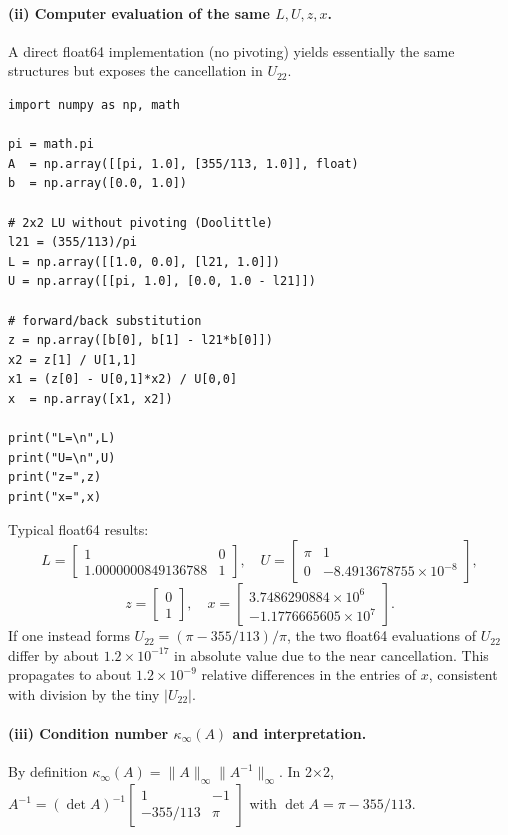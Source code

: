 \documentclass[11pt]{article}
\begin{document}
\paragraph{(ii) Computer evaluation of the same \(L,U,z,x\).}
A direct float64 implementation (no pivoting) yields essentially the same structures but exposes the cancellation in \(U_{22}\).

\begin{verbatim}
import numpy as np, math

pi = math.pi
A  = np.array([[pi, 1.0], [355/113, 1.0]], float)
b  = np.array([0.0, 1.0])

# 2x2 LU without pivoting (Doolittle)
l21 = (355/113)/pi
L = np.array([[1.0, 0.0], [l21, 1.0]])
U = np.array([[pi, 1.0], [0.0, 1.0 - l21]])

# forward/back substitution
z = np.array([b[0], b[1] - l21*b[0]])
x2 = z[1] / U[1,1]
x1 = (z[0] - U[0,1]*x2) / U[0,0]
x  = np.array([x1, x2])

print("L=\n",L)
print("U=\n",U)
print("z=",z)
print("x=",x)
\end{verbatim}

Typical float64 results:
\[
L=\begin{bmatrix}1&0\\ 1.0000000849136788&1\end{bmatrix},
\quad
U=\begin{bmatrix}\pi&1\\ 0&-8.4913678755\times10^{-8}\end{bmatrix},
\]
\[
z=\begin{bmatrix}0\\1\end{bmatrix},
\quad
x=\begin{bmatrix}3.7486290884\times10^{6}\\-1.1776665605\times10^{7}\end{bmatrix}.
\]
If one instead forms \(U_{22}=(\pi-355/113)/\pi\), the two float64 evaluations of \(U_{22}\) differ by about \(1.2\times10^{-17}\) in absolute value due to the near cancellation. This propagates to about \(1.2\times10^{-9}\) relative differences in the entries of \(x\), consistent with division by the tiny \(|U_{22}|\).

\paragraph{(iii) Condition number \(\kappa_\infty(A)\) and interpretation.}
By definition \(\kappa_\infty(A)=\|A\|_\infty\|A^{-1}\|_\infty\). In 2×2, \(A^{-1}=(\det A)^{-1}\begin{bmatrix}1&-1\\ -355/113&\pi\end{bmatrix}\) with \(\det A=\pi-355/113\).
\end{document}
